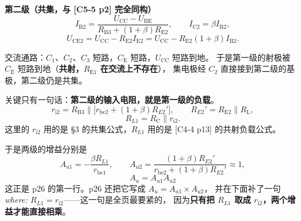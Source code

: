 \documentclass[11pt]{ctexart}
\begin{document}

\textbf{第二级（共集，与 [C5-5 p2] 完全同构）}
\[
I_{\mathrm{B2}}=\frac{U_{\mathrm{CC}}-U_{\mathrm{BE}}}{R_{\mathrm{B3}}+(1+\beta)R_{\mathrm{E2}}},\qquad
I_{\mathrm{C2}}=\beta I_{\mathrm{B2}},
\]
\[
U_{\mathrm{CE2}}=U_{\mathrm{CC}}-R_{\mathrm{E2}}I_{\mathrm{E2}}
=U_{\mathrm{CC}}-R_{\mathrm{E2}}(1+\beta)I_{\mathrm{B2}} .
\]



交流通路：$C_1$、$C_2$、$C_3$ 短路，$C_{\mathrm{E}}$ 短路，$U_{\mathrm{CC}}$ 短路到地。
于是第一级的射极被 $C_{\mathrm{E}}$ 短路到地（\textbf{共射，$R_{\mathrm{E1}}$ 在交流上不存在}），
集电极经 $C_2$ 直接接到第二级的基极，第二级仍是共集。

关键只有一句话：\textbf{第二级的输入电阻，就是第一级的负载}。
\[
r_{\mathrm{i}2}=R_{\mathrm{B3}}\parallel\bigl[r_{\mathrm{be2}}+(1+\beta)R_{E2}'\bigr],
\qquad R_{E2}'=R_{\mathrm{E2}}\parallel R_{\mathrm{L}},
\]
\[
R_{L1}=R_{\mathrm{C}}\parallel r_{\mathrm{i}2} .
\]
这里的 $r_{\mathrm{i}2}$ 用的是 §3 的共集公式，$R_{L1}$ 用的是 [C4-4 p13] 的共射负载公式。


于是两级的增益分别是
\[
A_{u1}=-\frac{\beta R_{L1}}{r_{\mathrm{be1}}},\qquad
A_{u2}=\frac{(1+\beta)R_{E2}'}{r_{\mathrm{be2}}+(1+\beta)R_{E2}'}\approx1,
\]
\[
\boxed{\;A_u=A_{u1}A_{u2}\;}
\]
这正是 p26 的第一行。p26 还把它写成 $A_u=A_{u1}\times A_{u2}$，
并在下面补了一句 \textit{where: $R_{L1}=r_{\mathrm{i}2}$}——这一句是全页最要紧的，
因为\textbf{只有把 $R_{L1}$ 取成 $r_{\mathrm{i}2}$，两个增益才能直接相乘}。
\end{document}
